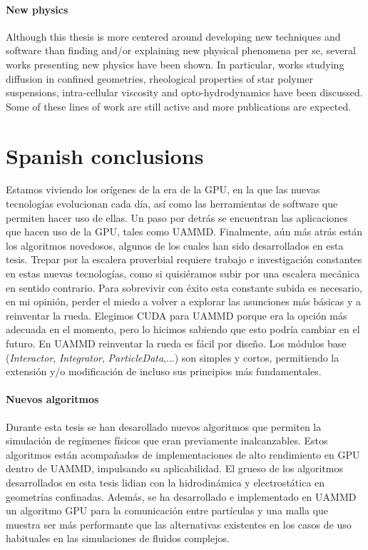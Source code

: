 \documentclass[ twoside,openright,titlepage,numbers=noenddot,%
headinclude,footinclude,cleardoublepage=empty,abstract=on,
BCOR=5mm,paper=b5,fontsize=11pt, dvipsnames
]{scrreprt}
\begin{document}
\subsubsection*{New physics}
Although this thesis is more centered around developing new techniques and software than finding and/or explaining new physical phenomena per se, several works presenting new physics have been shown. In particular, works studying diffusion in confined geometries, rheological properties of star polymer suspensions, intra-cellular viscosity and opto-hydrodynamics have been discussed. Some of these lines of work are still active and more publications are expected.



\chapter{Spanish conclusions}
Estamos viviendo los orígenes de la era de la GPU, en la que las nuevas tecnologías evolucionan cada día, así como las herramientas de software que permiten hacer uso de ellas. Un paso por detrás se encuentran las aplicaciones que hacen uso de la GPU, tales como UAMMD. Finalmente, aún más atrás están los algoritmos novedosos, algunos de los cuales han sido desarrollados en esta tesis. Trepar por la escalera proverbial requiere trabajo e investigación constantes en estas nuevas tecnologías, como si quisiéramos subir por una escalera mecánica en sentido contrario. Para sobrevivir con éxito esta constante subida es necesario, en mi opinión, perder el miedo a volver a explorar las asunciones más básicas y a reinventar la rueda. Elegimos CUDA para UAMMD porque era la opción más adecuada en el momento, pero lo hicimos sabiendo que esto podría cambiar en el futuro. En UAMMD reinventar la rueda es fácil por diseño. Los módulos base (\emph{Interactor}, \emph{Integrator}, \emph{ParticleData},...) son simples y cortos, permitiendo la extensión y/o modificación de incluso sus principios más fundamentales.

\subsubsection*{Nuevos algoritmos}
Durante esta tesis se han desarollado nuevos algoritmos que permiten la simulación de regímenes físicos que eran previamente inalcanzables. Estos algoritmos están acompañados de implementaciones de alto rendimiento en GPU dentro de UAMMD, impulsando su aplicabilidad. El grueso de los algoritmos desarrollados en esta tesis lidian con la hidrodinámica y electrostática en geometrías confinadas. Además, se ha desarrollado e implementado en UAMMD un algoritmo GPU para la comunicación entre partículas y una malla que muestra ser más performante que las alternativas existentes en los casos de uso habituales en las simulaciones de fluidos complejos.
\end{document}
